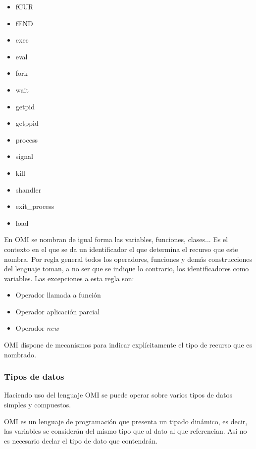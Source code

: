 \begin{multicols}{3}
\begin{itemize}
\item fCUR 
\item fEND 
\item exec 
\item eval 
\item fork 
\item wait 
\item getpid 
\item getppid 
\item process 
\item signal 
\item kill 
\item shandler 
\item exit\_process 
\item load 
\end{itemize}
\end{multicols}

En OMI se nombran de igual forma las variables, funciones, clases... Es el contexto 
en el que se da un identificador el que determina el recurso que este nombra. 
Por regla general todos los operadores, funciones y demás construcciones del lenguaje toman, 
a no ser que se indique lo contrario, los identificadores como variables. Las excepciones a esta regla son:

\begin {itemize}
   \item Operador llamada a función 
   \item Operador aplicación parcial
   \item Operador $new$
\end{itemize}

OMI dispone de mecanismos para indicar explícitamente el tipo de recurso que es nombrado.

\subsubsection{Tipos de datos}\label{sec:data_type}
Haciendo uso del lenguaje OMI se puede operar sobre varios tipos de datos simples y compuestos. 

OMI es un lenguaje de programación que presenta un tipado dinámico, es decir, las variables se considerán del mismo tipo que al dato al que 
referencian. Así no es necesario declar el tipo de dato que contendrán.

